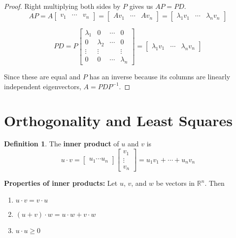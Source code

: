 \documentclass[letterpaper]{article}
\theoremstyle{definition}
\newtheorem{definition}{Definition}[section]
\begin{document}
\begin{proof}
Right multiplying both sides by $P$ gives us $AP = PD$. 
$$AP = A \begin{bmatrix}
v_1 & \cdots & v_n
\end{bmatrix} = \begin{bmatrix}
Av_1 & \cdots & Av_n
\end{bmatrix} = \begin{bmatrix}
\lambda_1 v_1 & \cdots & \lambda_n v_n
\end{bmatrix}$$

$$PD = P \begin{bmatrix}
\lambda_1 & 0 & \cdots & 0 \\
0 & \lambda_2 & \cdots & 0 \\
\vdots & \vdots &   & \vdots \\
0 & 0 & \cdots & \lambda_n
\end{bmatrix} = 
\begin{bmatrix}
\lambda_1 v_1 & \cdots & \lambda_n v_n
\end{bmatrix}$$

Since these are equal and $P$ has an inverse because its columns are linearly independent eigenvectors, $A = PDP^{-1}$.
\end{proof}

\section{Orthogonality and Least Squares}
\begin{definition}
The \textbf{inner product} of $u$ and $v$ is 
$$ u \cdot v = \begin{bmatrix}
u_1 \cdots u_n
\end{bmatrix} \begin{bmatrix}
v_1 \\
\vdots \\
v_n
\end{bmatrix} = u_1 v_1 + \cdots + u_n v_n$$

\textbf{Properties of inner products: }Let $u$, $v$, and $w$ be vectors in $\mathbb{R}^n$. Then 
\begin{enumerate}
	\item $u \cdot v = v \cdot u$
	\item $(u + v) \cdot w = u \cdot w + v \cdot w$
	\item $u \cdot u \geq 0$
\end{enumerate}
\end{definition}
\end{document}

